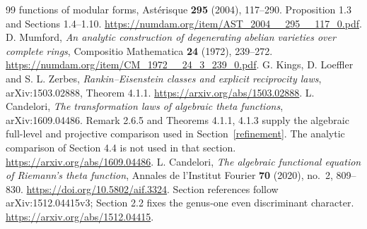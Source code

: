 \documentclass[11pt]{article}
\theoremstyle{remark}\newtheorem{remark}[theorem]{Remark}
\begin{document}
\begin{thebibliography}{99}
{functions of modular forms}, Ast\'erisque \textbf{295} (2004), 117--290.
Proposition 1.3 and Sections 1.4--1.10.
\url{https://numdam.org/item/AST_2004__295__117_0.pdf}.
 D. Mumford, \emph{An analytic construction of degenerating
abelian varieties over complete rings}, Compositio Mathematica
\textbf{24} (1972), 239--272.
\url{https://numdam.org/item/CM_1972__24_3_239_0.pdf}.
 G. Kings, D. Loeffler and S. L. Zerbes,
\emph{Rankin--Eisenstein classes and explicit reciprocity laws},
arXiv:1503.02888, Theorem 4.1.1.
\url{https://arxiv.org/abs/1503.02888}.
 L. Candelori, \emph{The transformation laws of algebraic
theta functions}, arXiv:1609.04486.
Remark 2.6.5 and Theorems 4.1.1, 4.1.3 supply the algebraic
full-level and projective comparison used in Section~\ref{refinement}.
The analytic comparison of Section 4.4 is not used in that section.
\url{https://arxiv.org/abs/1609.04486}.
 L. Candelori, \emph{The algebraic functional
 equation of Riemann's theta function}, Annales de l'Institut Fourier
\textbf{70} (2020), no.~2, 809--830.
\url{https://doi.org/10.5802/aif.3324}.
Section references follow arXiv:1512.04415v3; Section 2.2 fixes the
genus-one even discriminant character.
\url{https://arxiv.org/abs/1512.04415}.
\end{thebibliography}
\end{document}

